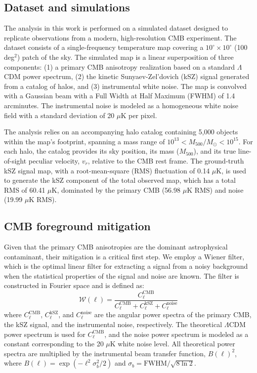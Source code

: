 \documentclass[]{article}
\begin{document}
\subsection{Dataset and simulations}
The analysis in this work is performed on a simulated dataset designed to replicate observations from a modern, high-resolution CMB experiment. The dataset consists of a single-frequency temperature map covering a $10^\circ \times 10^\circ$ (100 deg$^2$) patch of the sky. The simulated map is a linear superposition of three components: (1) a primary CMB anisotropy realization based on a standard $\Lambda$CDM power spectrum, (2) the kinetic Sunyaev-Zel'dovich (kSZ) signal generated from a catalog of halos, and (3) instrumental white noise. The map is convolved with a Gaussian beam with a Full Width at Half Maximum (FWHM) of 1.4 arcminutes. The instrumental noise is modeled as a homogeneous white noise field with a standard deviation of 20 $\mu$K per pixel.

The analysis relies on an accompanying halo catalog containing 5,000 objects within the map's footprint, spanning a mass range of $10^{13} < M_{500} / M_{\odot} < 10^{15}$. For each halo, the catalog provides its sky position, its mass ($M_{500}$), and its true line-of-sight peculiar velocity, $v_r$, relative to the CMB rest frame. The ground-truth kSZ signal map, with a root-mean-square (RMS) fluctuation of 0.14 $\mu$K, is used to generate the kSZ component of the total observed map, which has a total RMS of 60.41 $\mu$K, dominated by the primary CMB (56.98 $\mu$K RMS) and noise (19.99 $\mu$K RMS).

\subsection{CMB foreground mitigation}
Given that the primary CMB anisotropies are the dominant astrophysical contaminant, their mitigation is a critical first step. We employ a Wiener filter, which is the optimal linear filter for extracting a signal from a noisy background when the statistical properties of the signal and noise are known. The filter is constructed in Fourier space and is defined as:
\begin{equation}
    \mathcal{W}(\ell) = \frac{C_\ell^{\text{CMB}}}{C_\ell^{\text{CMB}} + C_\ell^{\text{kSZ}} + C_\ell^{\text{noise}}}
\end{equation}
where $C_\ell^{\text{CMB}}$, $C_\ell^{\text{kSZ}}$, and $C_\ell^{\text{noise}}$ are the angular power spectra of the primary CMB, the kSZ signal, and the instrumental noise, respectively. The theoretical $\Lambda$CDM power spectrum is used for $C_\ell^{\text{CMB}}$, and the noise power spectrum is modeled as a constant corresponding to the 20 $\mu$K white noise level. All theoretical power spectra are multiplied by the instrumental beam transfer function, $B(\ell)^2$, where $B(\ell) = \exp(-\ell^2 \sigma_b^2 / 2)$ and $\sigma_b = \text{FWHM} / \sqrt{8 \ln 2}$.
\end{document}
